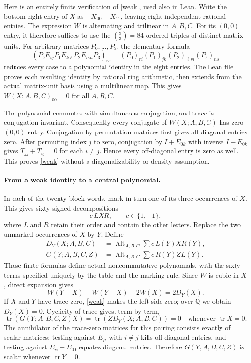 \documentclass[11pt,a4paper]{article}
\newcommand{\Q}{\mathbb Q}
\newcommand{\Alt}{\operatorname{Alt}_{A,B,C}}
\begin{document}
Here is an entirely finite verification of \eqref{weak}, used also in
Lean. Write the bottom-right entry of $X$ as $-X_{00}-X_{11}$, leaving
eight independent rational entries. The expression $W$ is alternating
and trilinear in $A,B,C$. For its $(0,0)$ entry, it therefore suffices
to use the $\binom93=84$ ordered triples of distinct matrix units.
For arbitrary matrices $P_0,\ldots,P_3$, the elementary formula
\[
(P_0E_{ij}P_1E_{k\ell}P_2E_{mn}P_3)_{rs}
=(P_0)_{ri}(P_1)_{jk}(P_2)_{\ell m}(P_3)_{ns}
\]
reduces every case to a polynomial identity in the eight entries.
The Lean file proves each resulting identity by rational ring arithmetic,
then extends from the actual matrix-unit basis using a multilinear map.
This gives $W(X;A,B,C)_{00}=0$ for all $A,B,C$.

The polynomial commutes with simultaneous conjugation, and trace is
conjugation invariant. Consequently every conjugate of $W(X;A,B,C)$
has zero $(0,0)$ entry. Conjugation by permutation matrices first gives
all diagonal entries zero. After permuting index $j$ to zero, conjugation
by $I+E_{0k}$ with inverse $I-E_{0k}$ gives $T_{jj}+T_{ij}=0$ for each
$i\ne j$. Hence every off-diagonal entry is zero as well. This proves
\eqref{weak} without a diagonalizability or density assumption.

\paragraph{From a weak identity to a central polynomial.}
In each of the twenty block words, mark in turn one of its three
occurrences of $X$. This gives sixty signed decompositions
\[
c\,LXR,\qquad c\in\{1,-1\},
\]
where $L$ and $R$ retain their order and contain the other letters.
Replace the two unmarked occurrences of $X$ by $Y$. Define
\[
\begin{aligned}
D_Y(X;A,B,C)&=\Alt\sum c\,L(Y)X R(Y),\\
G(Y;A,B,C,Z)&=\Alt\sum c\,R(Y)Z L(Y).
\end{aligned}
\]
These finite formulas define actual noncommutative polynomials, with
the sixty terms specified uniquely by the table and the marking rule.
Since $W$ is cubic in $X$, direct expansion gives
\[
W(Y+X)-W(Y-X)-2W(X)=2D_Y(X).
\]
If $X$ and $Y$ have trace zero, \eqref{weak} makes the left side zero;
over $\Q$ we obtain $D_Y(X)=0$. Cyclicity of trace gives, term by term,
\[
\operatorname{tr}(G(Y;A,B,C,Z)X)
=\operatorname{tr}(Z D_Y(X;A,B,C))=0
\quad\text{whenever }\operatorname{tr}X=0.
\]
The annihilator of the trace-zero matrices for this pairing consists
exactly of scalar matrices: testing against $E_{ji}$ with $i\ne j$
kills off-diagonal entries, and testing against $E_{ii}-E_{00}$ equates
diagonal entries. Therefore $G(Y;A,B,C,Z)$ is scalar whenever
$\operatorname{tr}Y=0$.
\end{document}
